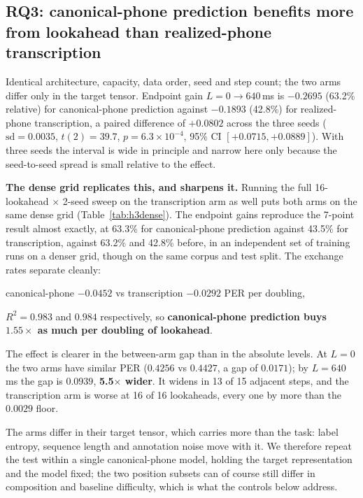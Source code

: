 \documentclass[journal]{IEEEtran}
\begin{document}
\subsection{RQ3: canonical-phone prediction benefits more from lookahead than realized-phone transcription}
\label{sec:rq3}

Identical architecture, capacity, data order, seed and step count; the two arms
differ only in the target tensor. Endpoint gain $L{=}0\rightarrow640$\,ms is
$-0.2695$ (63.2\% relative) for canonical-phone prediction against $-0.1893$
(42.8\%) for realized-phone transcription, a paired difference of $+0.0802$
across the three seeds ($\mathrm{sd}=0.0035$, $t(2)=39.7$, $p=6.3\times
10^{-4}$, 95\% CI $[+0.0715, +0.0889]$). With three seeds the interval is wide
in principle and narrow here only because the seed-to-seed spread is small
relative to the effect.

\textbf{The dense grid replicates this, and sharpens it.} Running the full
16-lookahead $\times$ 2-seed sweep on the transcription arm as well puts both
arms on the same dense grid (Table~\ref{tab:h3dense}). The endpoint gains
reproduce the 7-point result almost exactly, at 63.3\% for canonical-phone
prediction against
43.5\% for transcription, against 63.2\% and 42.8\% before, in an
independent set of training runs on a denser grid, though on the same corpus
and test split. The exchange rates separate cleanly:
\begin{center}
canonical-phone $-0.0452$ vs transcription $-0.0292$ PER per doubling,
\end{center}
$R^2 = 0.983$ and $0.984$ respectively, so \textbf{canonical-phone prediction
buys $\mathbf{1.55\times}$ as much per doubling of lookahead}.

The effect is clearer in the between-arm gap than in the absolute levels. At
$L{=}0$ the two arms have similar PER ($0.4256$ vs $0.4427$, a gap of
$0.0171$); by
$L{=}640$\,ms the gap is $0.0939$, \textbf{5.5$\times$ wider}. It widens in
13 of 15 adjacent steps, and the transcription arm is worse at 16 of 16
lookaheads, every one by more than the $0.0029$ floor.

The arms differ in their target tensor, which carries more than the task: label
entropy, sequence length and annotation noise move with it. We therefore repeat
the test within a single canonical-phone model, holding the target
representation and the model fixed; the two position subsets can of course
still differ in composition and baseline difficulty, which is what the controls
below address.
\end{document}
